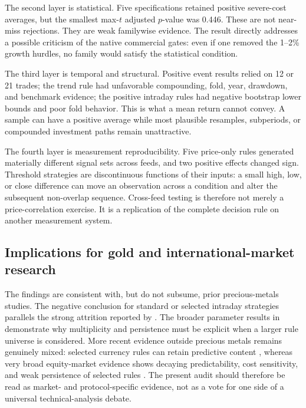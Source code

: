 The second layer is statistical. Five specifications retained positive severe-cost averages, but the smallest max-$t$ adjusted $p$-value was 0.446. These are not near-miss rejections. They are weak familywise evidence. The result directly addresses a possible criticism of the native commercial gates: even if one removed the 1--2\% growth hurdles, no family would satisfy the statistical condition.

The third layer is temporal and structural. Positive event results relied on 12 or 21 trades; the trend rule had unfavorable compounding, fold, year, drawdown, and benchmark evidence; the positive intraday rules had negative bootstrap lower bounds and poor fold behavior. This is what a mean return cannot convey. A sample can have a positive average while most plausible resamples, subperiods, or compounded investment paths remain unattractive.

The fourth layer is measurement reproducibility. Five price-only rules generated materially different signal sets across feeds, and two positive effects changed sign. Threshold strategies are discontinuous functions of their inputs: a small high, low, or close difference can move an observation across a condition and alter the subsequent non-overlap sequence. Cross-feed testing is therefore not merely a price-correlation exercise. It is a replication of the complete decision rule on another measurement system.

\subsection{Implications for gold and international-market research}

The findings are consistent with, but do not subsume, prior precious-metals studies. The negative conclusion for standard or selected intraday strategies parallels the strong attrition reported by \citet{jin2022}. The broader parameter results in \citet{batten2018} demonstrate why multiplicity and persistence must be explicit when a larger rule universe is considered. More recent evidence outside precious metals remains genuinely mixed: selected currency rules can retain predictive content \citep{dockery2023}, whereas very broad equity-market evidence shows decaying predictability, cost sensitivity, and weak persistence of selected rules \citep{rink2023}. The present audit should therefore be read as market- and protocol-specific evidence, not as a vote for one side of a universal technical-analysis debate.

